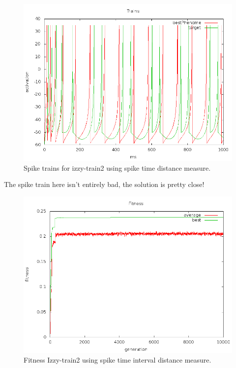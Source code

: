 \documentclass[a4paper]{article}
\begin{document}
\begin{figure}[htb!]
  \centering
  \includegraphics[width=\textwidth]{SpikeTime-izzy2-trains-plot.png}
  \caption{Spike trains for izzy-train2 using spike time distance measure.}
\end{figure}

The spike train here isn't entirely bad, the solution is pretty close!

\newpage

\begin{figure}[htb!]
  \centering
  \includegraphics[width=\textwidth]{SpikeInterval-izzy2-fitness-plot.png}
  \caption{Fitness Izzy-train2 using spike time interval distance measure.}
\end{figure}
\end{document}
